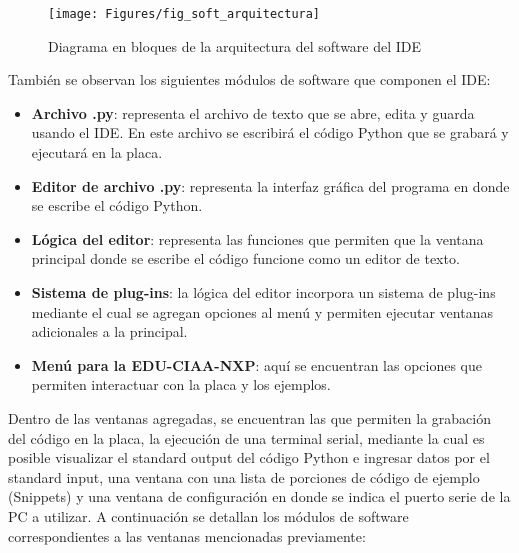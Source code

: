 \begin{figure}[ht]
  \centering
    \texttt{[image: Figures/fig\_soft\_arquitectura]}
  \caption{Diagrama en bloques de la arquitectura del software del IDE}
  \label{fig:softwareArq}
\end{figure}

También se observan los siguientes módulos de software que componen el IDE:

\begin{itemize}
	\item \textbf{Archivo .py}: representa el archivo de texto que se abre, edita y guarda usando el IDE. En este archivo se escribirá el código Python que se grabará y ejecutará en la placa.
	\item \textbf{Editor de archivo .py}: representa la interfaz gráfica del programa en donde se escribe el código Python.
	\item \textbf{Lógica del editor}: representa las funciones que permiten que la ventana principal donde se escribe el código funcione como un editor de texto.
	\item \textbf{Sistema de plug-ins}: la lógica del editor incorpora un sistema de plug-ins mediante el cual se agregan opciones al menú y permiten ejecutar ventanas adicionales a la principal.
	\item \textbf{Menú para la EDU-CIAA-NXP}: aquí se encuentran las opciones que permiten interactuar con la placa y los ejemplos.
\end{itemize}

Dentro de las ventanas agregadas, se encuentran las que permiten la grabación del código en la placa, la ejecución de una terminal serial, mediante la cual es posible visualizar el standard output del código Python e ingresar datos por el standard input, una ventana con una lista de porciones de código de ejemplo (Snippets) y una ventana de configuración en donde se indica el puerto serie de la PC a utilizar.
A continuación se detallan los módulos de software correspondientes a las ventanas mencionadas previamente:

